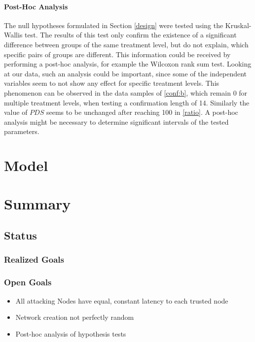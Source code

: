 \documentclass[a4paper,12pt,twoside]{report}
\begin{document}
\subsubsection{Post-Hoc Analysis}
The null hypotheses formulated in Section \ref{design} were tested using the Kruskal-Wallis test. The results of this test only confirm the existence of a significant difference between groups of the same treatment level, but do not explain, which specific pairs of groups are different. This information could be received by performing a post-hoc analysis, for example the Wilcoxon rank sum test. Looking at our data, such an analysis could be important, since some of the independent variables seem to not show any effect for specific treatment levels. This phenomenon can be observed in the data samples of \autoref{conf:b}, which remain 0 for multiple treatment levels, when testing a confirmation length of 14. Similarly the value of $PDS$ seems to be unchanged after reaching 100 in \autoref{ratio}. A post-hoc analysis might be necessary to determine significant intervals of the tested parameters.


\chapter{Model}



\chapter{Summary}

\section{Status}

\subsection{Realized Goals}

\subsection{Open Goals}
\begin{itemize}
\item All attacking Nodes have equal, constant latency to each trusted node
\item Network creation not perfectly random
\item Post-hoc analysis of hypothesis tests
\end{itemize}
\end{document}
